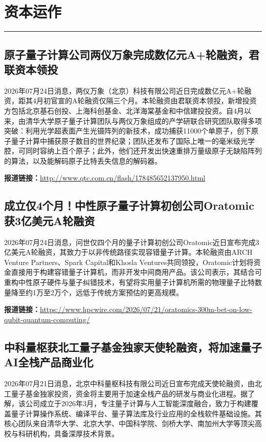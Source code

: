\documentclass[12pt,a4paper]{ctexart}
\begin{document}
\newpage
\section{资本运作}
\vspace{-0.5em}
\noindent\rule{\linewidth}{1.5pt}

\subsection{ 原子量子计算公司两仪万象完成数亿元A+轮融资，君联资本领投 }

2026年07月24日消息，两仪万象（北京）科技有限公司近日完成数亿元A+轮融资，距其4月初官宣的A轮融资仅隔三个月。本轮融资由君联资本领投，新增投资方包括北京基石创投、上海科创基金、北洋海棠基金和中信建投投资。自4月以来，由清华大学原子量子计算团队与两仪万象组成的产学研联合研究团队取得多项突破：利用光学超表面产生光镊阵列的新技术，成功捕获11000个单原子，创下原子量子计算中捕获原子数目的世界纪录；团队还发布了国际上唯一的毫米级光学腔，可同时容纳上百个原子；此外，他们还开发出快速重排万量级原子无缺陷阵列的算法，以及能解码原子比特丢失信息的解码器。

\noindent\textbf{报道链接：}\url{http://www.qtc.com.cn/flash/178485652137950.html}

\subsection{ 成立仅4个月！中性原子量子计算初创公司Oratomic获3亿美元A轮融资 }

2026年07月24日消息，问世仅四个月的量子计算初创公司Oratomic近日宣布完成3亿美元A轮融资，其致力于以非传统路径实现容错量子计算。本轮融资由ARCH Venture Partners、Spark Capital和Khosla Ventures共同领投，Oratomic计划将资金直接用于构建容错量子计算机，而非开发中间商用产品。该公司表示，其结合可重构中性原子硬件与量子纠错技术，有望将实用量子计算机所需的物理量子比特数量降至约1万至2万个，远低于传统方案预估的更高规模。

\noindent\textbf{报道链接：}\url{https://www.hpcwire.com/2026/07/21/oratomics-300m-bet-on-low-qubit-quantum-computing/}

\subsection{ 中科量枢获北工量子基金独家天使轮融资，将加速量子AI全栈产品商业化 }

2026年07月21日消息，北京中科量枢科技有限公司近日宣布完成天使轮融资，由北工量子基金独家投资，资金将主要用于加速全栈产品的研发与商业化进程。据了解，该公司成立于2026年3月，专注量子计算与人工智能深度融合，致力于构建覆盖量子计算操作系统、编译平台、量子算法库及行业应用的全栈软件基础设施。其核心团队来自清华大学、北京大学、中国科学院、剑桥大学、南加州大学等顶尖高校与科研机构，具备深厚技术背景。
\end{document}
